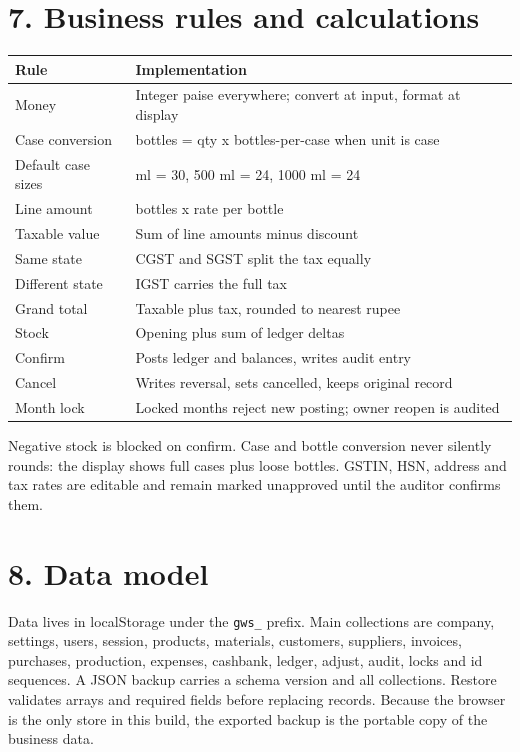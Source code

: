 \documentclass[11pt]{article}
\begin{document}
\section{7. Business rules and calculations}
\begin{center}\small\begin{tabularx}{\linewidth}{|*{2}{>{\raggedright\arraybackslash}X|}}
\hline
\textbf{Rule} & \textbf{Implementation} \\
\hline
Money & Integer paise everywhere; convert at input, format at display \\
\hline
Case conversion & bottles = qty x bottles-per-case when unit is case \\
\hline
Default case sizes & 300 ml = 30, 500 ml = 24, 1000 ml = 24 \\
\hline
Line amount & bottles x rate per bottle \\
\hline
Taxable value & Sum of line amounts minus discount \\
\hline
Same state & CGST and SGST split the tax equally \\
\hline
Different state & IGST carries the full tax \\
\hline
Grand total & Taxable plus tax, rounded to nearest rupee \\
\hline
Stock & Opening plus sum of ledger deltas \\
\hline
Confirm & Posts ledger and balances, writes audit entry \\
\hline
Cancel & Writes reversal, sets cancelled, keeps original record \\
\hline
Month lock & Locked months reject new posting; owner reopen is audited \\
\hline
\end{tabularx}\end{center}
Negative stock is blocked on confirm. Case and bottle conversion never silently rounds: the display shows full cases plus loose bottles. GSTIN, HSN, address and tax rates are editable and remain marked unapproved until the auditor confirms them.
\clearpage
\section{8. Data model}
Data lives in localStorage under the \texttt{gws\_} prefix. Main collections are company, settings, users, session, products, materials, customers, suppliers, invoices, purchases, production, expenses, cashbank, ledger, adjust, audit, locks and id sequences.
A JSON backup carries a schema version and all collections. Restore validates arrays and required fields before replacing records. Because the browser is the only store in this build, the exported backup is the portable copy of the business data.
\clearpage
\end{document}
